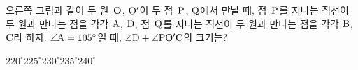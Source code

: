 \noindent\begin{minipage}[t]{0.58\linewidth}\vspace{0pt}\raggedright 오른쪽 그림과 같이 두 원~$\mathrm{O}$, $\mathrm{O'}$이 두 점~$\mathrm{P}$, $\mathrm{Q}$에서 만날 때, 점~$\mathrm{P}$를 지나는 직선이 두 원과 만나는 점을 각각 $\mathrm{A}$, $\mathrm{D}$, 점~$\mathrm{Q}$를 지나는 직선이 두 원과 만나는 점을 각각 $\mathrm{B}$, $\mathrm{C}$라 하자. $\angle\mathrm{A}=105^\circ$일 때, $\angle\mathrm{D}+\angle\mathrm{PO'C}$의 크기는?\end{minipage}\hfill\begin{minipage}[t]{0.4\linewidth}\vspace{0pt}\centering \resizebox{\ifdim\width>\linewidth\linewidth\else\width\fi}{!}{}\end{minipage}\par
\begin{choices32}{$220^\circ$}{$225^\circ$}{$230^\circ$}{$235^\circ$}{$240^\circ$}\end{choices32}
